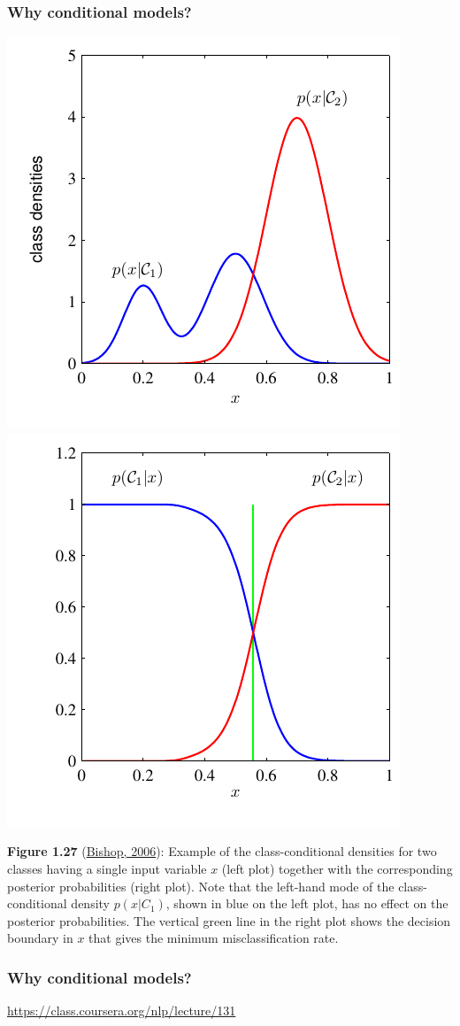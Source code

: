 \documentclass[ignorenonframetext,plain]{beamer}
\begin{document}
\begin{frame}\frametitle{Why conditional models?}
\begin{center}
\includegraphics[width=.5\textwidth]{images/Figure1-27a.pdf}
\includegraphics[width=.5\textwidth]{images/Figure1-27b.pdf}
\end{center}
\scriptsize {\bf Figure 1.27}
(\href{http://research.microsoft.com/en-us/um/people/cmbishop/prml}
{Bishop, 2006}): Example of the class-conditional densities for two
classes having a single input variable $x$ (left plot) together with
the corresponding posterior probabilities (right plot). Note that the
left-hand mode of the class-conditional density $p(x|C_1)$, shown in
blue on the left plot, has no effect on the posterior
probabilities. The vertical green line in the right plot shows the
decision boundary in $x$ that gives the minimum misclassiﬁcation rate.
\end{frame}

\begin{frame}\frametitle{Why conditional models?}
\begin{itemize}
\url{https://class.coursera.org/nlp/lecture/131}

\end{itemize}
\end{frame}
\end{document}
